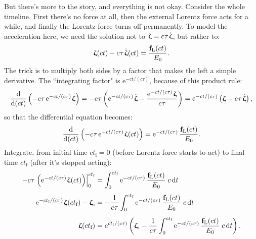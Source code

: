 \documentclass[12pt]{article}
\renewcommand{\vv}[1]{\mathbf{#1}}
\newcommand{\dd}[1]{\mathrm{d}#1}
\newcommand{\vvzeta}{\bm{\upzeta}}
\begin{document}
But there's more to the story, and everything is not okay. Consider the whole timeline. First there's no force at all, then the external Lorentz force acts for a while, and finally the Lorentz force turns off permanently. To model the acceleration here, we need the solution not to $\vvzeta = c \mkern.5mu \tau \mkern1.5mu \dot{\vvzeta} $, but rather to:
\begin{equation*}
\vvzeta(ct) - c \mkern.5mu \tau \mkern1.5mu \dot{\vvzeta} (ct) = \dfrac{\vv f_{\textrm{L}} (ct)}{E_0} .
\end{equation*}
The trick is to multiply both sides by a factor that makes the left a simple derivative. The ``integrating factor" is $\textrm{e}^{-ct / (c \tau)}$, because of this product rule:
\begin{equation*}
\dfrac{\dd}{\dd (ct)} \left( - c \mkern.5mu \tau \mkern2.5mu \textrm{e}^{-ct / (c \tau)} \mkern1mu \vvzeta \right) = - c \mkern.5mu \tau \left( \textrm{e}^{-ct / (c \tau)} \mkern1mu \dot{\vvzeta} - \dfrac{\textrm{e}^{-ct / (c \tau)} \mkern1mu \vvzeta}{c \mkern.5mu \tau} \right) = \textrm{e}^{-ct / (c \tau)} \left( \vvzeta - c \mkern.5mu \tau \mkern1.5mu \dot{\vvzeta} \right) ,
\end{equation*}
so that the differential equation becomes:
\begin{equation*}
\dfrac{\dd}{\dd (ct)} \left( - c \mkern.5mu \tau \mkern2.5mu \textrm{e}^{-ct / (c \tau)} \mkern1mu \vvzeta (ct) \right) = \textrm{e}^{-ct / (c \tau)} \, \dfrac{ \vv f_{\textrm{L}} (ct)}{E_0} .
\end{equation*}
Integrate, from initial time $ct_{\textrm{i}} = 0$ (before Lorentz force starts to act) to final time $ct_{\textrm{f}}$ (after it's stopped acting):
\begin{equation*}
\begin{aligned}
- c \mkern.5mu \tau \left. \Big( \textrm{e}^{-ct / (c \tau)} \mkern1mu \vvzeta (ct) \Big) \right|_{0}^{ct_{\textrm{f}}} &= \int_{0}^{ct_{\textrm{f}}} \textrm{e}^{-ct / (c \tau)} \, \dfrac{ \vv f_{\textrm{L}} (ct)}{E_0}  \; c \, \dd t \\[3pt]
\textrm{e}^{-ct_{\textrm{f}} / (c \tau)} \mkern1mu \vvzeta (ct_{\textrm{f}}) - \vvzeta_{\mkern1mu \textrm{i}} &= - \dfrac{1}{c \mkern.5mu \tau} \int_{0}^{ct_{\textrm{f}}} \textrm{e}^{-ct / (c \tau)} \, \dfrac{ \vv f_{\textrm{L}} (ct)}{E_0}  \; c \, \dd t \\[4pt]
\vvzeta (ct_{\textrm{f}}) &= \textrm{e}^{ct_{\textrm{f}} / (c \tau)} \left( \vvzeta_{\mkern1mu \textrm{i}} - \dfrac{1}{c \mkern.5mu \tau} \int_{0}^{ct_{\textrm{f}}} \textrm{e}^{-ct / (c \tau)} \, \dfrac{ \vv f_{\textrm{L}} (ct)}{E_0}  \; c \, \dd t \right) .
\end{aligned}
\end{equation*}
\end{document}

